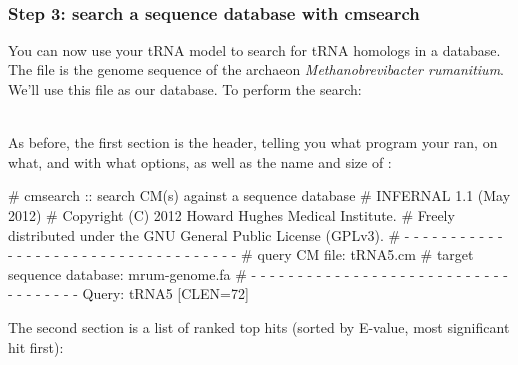 \\
 
\subsubsection{Step 3: search a sequence database with cmsearch}

You can now use your tRNA model to search for tRNA homologs in a
database. The file  is the genome sequence of the
archaeon \emph{Methanobrevibacter rumanitium}. We'll use this file as
our database. To perform the search:

\\

As before, the first section is the header, telling you what program
your ran, on what, and with what options, as well as the name and size
of :

\begin{sreoutput}
# cmsearch :: search CM(s) against a sequence database
# INFERNAL 1.1 (May 2012)
# Copyright (C) 2012 Howard Hughes Medical Institute.
# Freely distributed under the GNU General Public License (GPLv3).
# - - - - - - - - - - - - - - - - - - - - - - - - - - - - - - - - - - - -
# query CM file:                         tRNA5.cm
# target sequence database:              mrum-genome.fa
# - - - - - - - - - - - - - - - - - - - - - - - - - - - - - - - - - - - -
Query:       tRNA5  [CLEN=72]
\end{sreoutput}

The second section is a list of ranked top hits (sorted by E-value,
most significant hit first):

